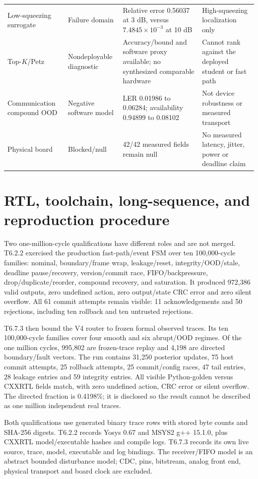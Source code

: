 \documentclass[11pt]{article}
\begin{document}
{\begin{longtable}{@{}L{0.20\textwidth} L{0.17\textwidth} L{0.31\textwidth} L{0.22\textwidth}@{}}
Low-squeezing surrogate & Failure domain & Relative error 0.56037 at 3 dB, versus $7.4845\times10^{-3}$ at 10 dB & High-squeezing localization only \\
Top-$K$/Petz & Nondeployable diagnostic & Accuracy/bound and software proxy available; no synthesized comparable hardware & Cannot rank against the deployed student or fast path \\
Communication compound OOD & Negative software model & LER 0.01986 to 0.06284; availability 0.94899 to 0.08102 & Not device robustness or measured transport \\
Physical board & Blocked/null & 42/42 measured fields remain null & No measured latency, jitter, power or deadline claim \\
\bottomrule
\end{longtable}
}

\section{RTL, toolchain, long-sequence, and reproduction procedure}

Two one-million-cycle qualifications have different roles and are not merged.
T6.2.2 exercised the production fast-path/event FSM over ten 100,000-cycle
families: nominal, boundary/frame wrap, leakage/reset, integrity/OOD/stale,
deadline pause/recovery, version/commit race, FIFO/backpressure,
drop/duplicate/reorder, compound recovery, and saturation.  It produced
972,386 valid outputs, zero undefined action, zero output/state CRC error and
zero silent overflow.  All 61 commit attempts remain visible: 11 acknowledgements
and 50 rejections, including ten rollback and ten untrusted rejections.

T6.7.3 then bound the V4 router to frozen formal observed traces.  Its ten
100,000-cycle families cover four smooth and six abrupt/OOD regimes.  Of the
one million cycles, 995,802 are frozen-trace replay and 4,198 are directed
boundary/fault vectors.  The run contains 31,250 posterior updates, 75 host
commit attempts, 25 rollback attempts, 25 commit/config races, 47 tail entries,
28 leakage entries and 59 integrity entries.  All visible Python-golden versus
CXXRTL fields match, with zero undefined action, CRC error or silent overflow.
The directed fraction is 0.4198\%; it is disclosed so the result cannot be
described as one million independent real traces.

Both qualifications use generated binary trace rows with stored byte counts
and SHA-256 digests.  T6.2.2 records Yosys 0.67 and MSYS2 g++ 15.1.0, plus
CXXRTL model/executable hashes and compile logs.  T6.7.3 records its own live
source, trace, model, executable and log bindings.  The receiver/FIFO model is
an abstract bounded disturbance model; CDC, pins, bitstream, analog front end,
physical transport and board clock are excluded.
\end{document}
